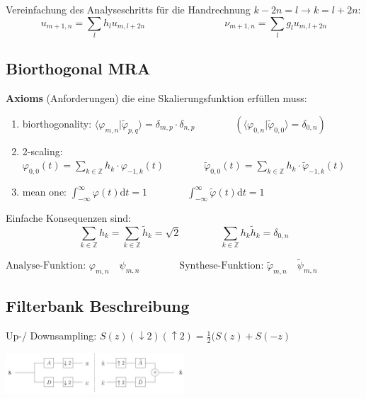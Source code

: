 Vereinfachung des Analyseschritts für die Handrechnung $k-2n=l\rightarrow k=l+2n$:
\[ 
	u_{m+1,n} = \sum_{l} h_{l} u_{m,l+2n}
	\qquad \qquad \qquad \qquad
	\nu_{m+1,n} = \sum_{l} g_{l} u_{m,l+2n}
\]


\subsection{Biorthogonal MRA}

\textbf{Axioms} (Anforderungen) die eine Skalierungsfunktion erfüllen muss:
\begin{enumerate}
	\item biorthogonality: $ \langle \varphi_{m,n}|\tilde{\varphi}_{p,q} \rangle = \delta_{m,p}\cdot \delta_{n,p} \qquad \qquad \left( \langle \varphi_{0,n}|\tilde{\varphi}_{0,0} \rangle = \delta_{0,n} \right)$
	\item 2-scaling: $ \varphi_{0,0}(t) = \sum_{k \in \mathbb{Z}} h_k \cdot \varphi_{-1,k}(t) \qquad \qquad  \tilde{\varphi}_{0,0}(t) = \sum_{k \in \mathbb{Z}} h_k \cdot \tilde{\varphi}_{-1,k}(t) $
	\item mean one: $ \int_{-\infty}^{\infty}\varphi(t) \mathrm{d}t = 1 \qquad \qquad \int_{-\infty}^{\infty}\tilde{\varphi}(t) \mathrm{d}t = 1$
\end{enumerate}

Einfache Konsequenzen sind:
\[ 
	\sum_{k \in  \mathbb{Z}} h_k = \sum_{k \in  \mathbb{Z}} \tilde{h}_k = \sqrt{2} 
	\qquad \qquad
	\sum_{k \in  \mathbb{Z}} h_k \tilde{h}_k = \delta_{0,n}
\]

$  
	\text{Analyse-Funktion: } \varphi_{m,n} \quad \psi_{m,n}
	\qquad \qquad
	\text{Synthese-Funktion: } \tilde{\varphi}_{m,n} \quad \tilde{\psi}_{m,n}
$


\subsection{Filterbank Beschreibung}
Up-/ Downsampling: $ S(z) (\downarrow 2)(\uparrow 2) = \frac{1}{2} (S(z)+S(-z) $

\vspace{-2cm}

\begin{flushright}
	\includegraphics[width=0.5\textwidth]{content/FilterBank.pdf} 
\end{flushright}
 

